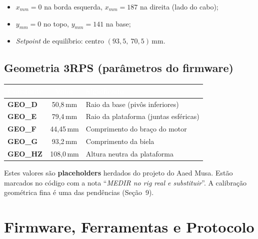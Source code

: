 \documentclass[11pt,a4paper,oneside]{article}
\newcommand{\rowstyle}{\rowcolor{rowgray}}
\begin{document}
\begin{itemize}
  \item $x_{mm}=0$ na borda esquerda, $x_{mm}=187$ na direita (lado do cabo);
  \item $y_{mm}=0$ no topo, $y_{mm}=141$ na base;
  \item \emph{Setpoint} de equilíbrio: centro $(93{,}5,\ 70{,}5)$\,mm.
\end{itemize}

\subsection{Geometria 3RPS (parâmetros do firmware)}

\begin{center}
\small
\renewcommand{\arraystretch}{1.2}
\begin{tabular}{>{\ttfamily\bfseries}l c >{\RaggedRight\arraybackslash}p{7.5cm}}
\toprule
\rowcolor{primary}
\textcolor{white}{Constante} & \textcolor{white}{Valor} & \textcolor{white}{\normalfont\bfseries Significado} \\
\midrule
GEO\_D & 50,8\,mm & Raio da base (pivôs inferiores) \\
\rowstyle GEO\_E & 79,4\,mm & Raio da plataforma (juntas esféricas) \\
GEO\_F & 44,45\,mm & Comprimento do braço do motor \\
\rowstyle GEO\_G & 93,2\,mm & Comprimento da biela \\
GEO\_HZ & 108,0\,mm & Altura neutra da plataforma \\
\bottomrule
\end{tabular}
\end{center}

\begin{problembox}
Estes valores são \textbf{placeholders} herdados do projeto do Aaed Musa. Estão
marcados no código com a nota ``\emph{MEDIR no rig real e substituir}''. A
calibração geométrica fina é uma das pendências (Seção~9).
\end{problembox}

\section{Firmware, Ferramentas e Protocolo}
\end{document}
